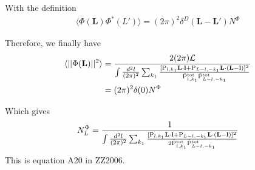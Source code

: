 \documentclass[12pt]{article}
\newcommand{\beq}{\begin{equation}}
\newcommand{\eeq}{\end{equation}}
\newcommand{\beqal}{\begin{aligned}}
\newcommand{\eeqal}{\end{aligned}}
\def\l{{\bf l}}
\def\L{{\bf L}}
\def\pul{{\rm P}}
\def\ptot{{\tilde{\rm P}^{\rm tot}}}
\def\d2l{\frac{d^2l}{(2\pi)^2}}
\def\dko{\frac{dk_1}{2\pi}}
\def\lbox{\mathcal{L}}
\numberwithin{equation}{section}
\begin{document}
%
%
%
%
With the definition
\begin{eqnarray}
\langle \Phi(\textbf{L}) \Phi^*(L') \rangle  = (2\pi)^2 \delta^D(\textbf{L} - \textbf{L}') N^\Phi
\end{eqnarray}

Therefore, we finally have
\beq
\beqal
\langle ||\Phi(\L)||^2\rangle 
& =   \frac{2 (2\pi) \lbox}{\int \frac{d^2 l}{(2\pi)^2} \sum_{k_1} \frac{[\pul_{l,k_1} \L\cdot \l +
		\pul_{L-l,-k_1} \L\cdot (\L-\l)]^2}{\ptot_{l,k_1}\ptot_{L-l,-k_1}} }
\\
& = (2\pi)^2 \delta(0) N^\Phi
\eeqal
\eeq

Which gives
\beq
\beqal
N_L^\Phi = \frac{1}{{\int \frac{d^2 l}{(2\pi)^2} \sum_{k_1} \frac{[\pul_{l,k_1} \L\cdot \l +
			\pul_{L-l,-k_1} \L\cdot (\L-\l)]^2}{2\ptot_{l,k_1}\ptot_{L-l,-k_1}} }}
\eeqal
\eeq
This is equation A20 in ZZ2006.
\end{document}
